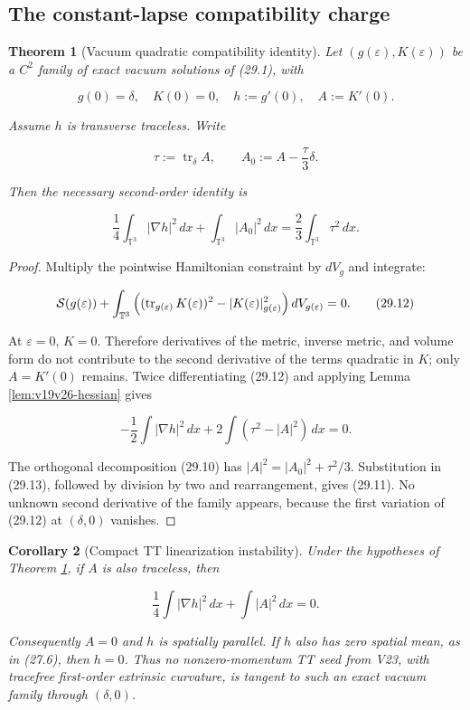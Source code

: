 \documentclass[11pt]{article}
\newtheorem{theorem}{Theorem}[section]
\newtheorem{corollary}[theorem]{Corollary}
\theoremstyle{remark}
\begin{document}
\subsection{The constant-lapse compatibility charge}

\begin{theorem}[Vacuum quadratic compatibility identity]
\label{thm:v19v26-taub}
Let \((g(\varepsilon),K(\varepsilon))\) be a \(C^2\) family of exact
vacuum solutions of (29.1), with

\[
 g(0)=\delta,\quad K(0)=0,\quad
 h:=g'(0),\quad A:=K'(0).                                     \tag{29.9}
\]

Assume \(h\) is transverse traceless.  Write

\[
 \tau:=\operatorname{tr}_\delta A,\qquad
 A_0:=A-\frac{\tau}{3}\delta.                                 \tag{29.10}
\]

Then the necessary second-order identity is

\[
 \boxed{\quad
 \frac14\int_{\mathbb T^3}|\nabla h|^2\,dx
 +\int_{\mathbb T^3}|A_0|^2\,dx
 =\frac23\int_{\mathbb T^3}\tau^2\,dx .
 \quad}                                                       \tag{29.11}
\]
\end{theorem}

\begin{proof}
Multiply the pointwise Hamiltonian constraint by \(dV_g\) and integrate:

\[
 {\cal S}(g(\varepsilon))
 +\int_{\mathbb T^3}
 \left((\operatorname{tr}_{g(\varepsilon)}K(\varepsilon))^2
       -|K(\varepsilon)|_{g(\varepsilon)}^2\right)
 dV_{g(\varepsilon)}=0.                                      \tag{29.12}
\]

At \(\varepsilon=0\), \(K=0\).  Therefore derivatives of the metric,
inverse metric, and volume form do not contribute to the second
derivative of the terms quadratic in \(K\); only \(A=K'(0)\) remains.
Twice differentiating (29.12) and applying Lemma
\ref{lem:v19v26-hessian} gives

\[
 -\frac12\int|\nabla h|^2\,dx
 +2\int\left(\tau^2-|A|^2\right)\,dx=0.                       \tag{29.13}
\]

The orthogonal decomposition (29.10) has
\(|A|^2=|A_0|^2+\tau^2/3\).  Substitution in (29.13), followed by division
by two and rearrangement, gives (29.11).  No unknown second derivative of
the family appears, because the first variation of (29.12) at
\((\delta,0)\) vanishes.
\end{proof}

\begin{corollary}[Compact TT linearization instability]
\label{cor:v19v26-instability}
Under the hypotheses of Theorem \ref{thm:v19v26-taub}, if \(A\) is also
traceless, then

\[
 \frac14\int|\nabla h|^2\,dx+\int|A|^2\,dx=0.                 \tag{29.14}
\]

Consequently \(A=0\) and \(h\) is spatially parallel.  If \(h\) also has
zero spatial mean, as in (27.6), then \(h=0\).  Thus no nonzero-momentum TT
seed from V23, with tracefree first-order extrinsic curvature, is tangent
to such an exact vacuum family through \((\delta,0)\).
\end{corollary}
\end{document}
